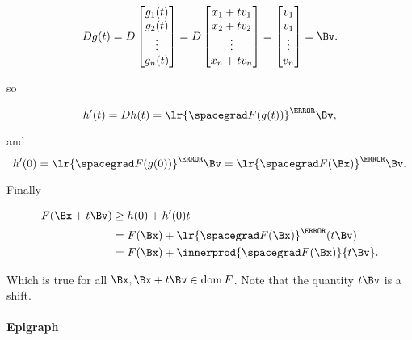 \begin{equation}\label{eqn:convexOptimizationLecture6:660}
D g(t)
=
D
\begin{bmatrix}
g_1(t) \\
g_2(t) \\
\vdots \\
g_n(t) \\
\end{bmatrix}
=
D
\begin{bmatrix}
x_1 + t v_1 \\
x_2 + t v_2 \\
\vdots \\
x_n + t v_n \\
\end{bmatrix}
=
\begin{bmatrix}
v_1 \\
v_1 \\
\vdots \\
v_n \\
\end{bmatrix}
=
\Bv.
\end{equation}

so

\begin{dmath}\label{eqn:convexOptimizationLecture6:680}
h'(t) = D h(t) = \lr{ \spacegrad F(g(t))}^\T \Bv,
\end{dmath}

and
\begin{dmath}\label{eqn:convexOptimizationLecture6:700}
h'(0) = \lr{ \spacegrad F(g(0))}^\T \Bv
=
\lr{ \spacegrad F(\Bx)}^\T \Bv.
\end{dmath}

Finally

\begin{dmath}\label{eqn:convexOptimizationLecture6:720}
\begin{aligned}
F(\Bx + t \Bv)
&\ge h(0) + h'(0) t \\
&= F(\Bx) + \lr{ \spacegrad F(\Bx) }^\T (t \Bv) \\
&= F(\Bx) + \innerprod{ \spacegrad F(\Bx) }{ t \Bv}.
\end{aligned}
\end{dmath}

Which is true for all \( \Bx, \Bx + t \Bv \in \dom F \).  Note that the quantity \( t \Bv \) is a shift.

\paragraph{Epigraph}

